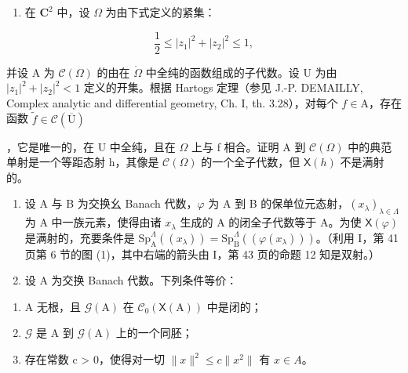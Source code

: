 \begin{enumerate}
\def\labelenumi{\arabic{enumi})}
\setcounter{enumi}{13}
\tightlist
\item
  在 \(\mathbf{C}^2\) 中，设 \(\Omega\) 为由下式定义的紧集：
\end{enumerate}

\[
\frac {1}{2} \leqslant | z _ {1} | ^ {2} + | z _ {2} | ^ {2} \leqslant 1,
\]

并设 A 为 \(\mathcal{C}(\Omega)\) 的由在 \(\mathring{\Omega}\) 中全纯的函数组成的子代数。设 U 为由 \(|z_1|^2 + |z_2|^2 < 1\) 定义的开集。根据 Hartogs 定理（参见 J.-P. DEMAILLY, Complex analytic and differential geometry, Ch. I, th. 3.28），对每个 \(f \in \mathrm{A}\)，存在函数 \(\widetilde{f} \in \mathcal{C}(\overline{\mathrm{U}})\)

，它是唯一的，在 U 中全纯，且在 \(\Omega\) 上与 f 相合。证明 A 到 \(\mathcal{C}(\Omega)\) 中的典范单射是一个等距态射 h，其像是 \(\mathcal{C}(\Omega)\) 的一个全子代数，但 \(\mathsf{X}(h)\) 不是满射的。

\begin{enumerate}
\def\labelenumi{\arabic{enumi})}
\setcounter{enumi}{14}
\item
  设 A 与 B 为交换幺 Banach 代数，\(\varphi\) 为 A 到 B 的保单位元态射，\((x_{\lambda})_{\lambda \in \Lambda}\) 为 A 中一族元素，使得由诸 \(x_{\lambda}\) 生成的 A 的闭全子代数等于 A。为使 \(\mathsf{X}(\varphi)\) 是满射的，充要条件是 \(\mathrm{Sp}_{\mathrm{A}}^{\Lambda}((x_{\lambda})) = \mathrm{Sp}_{\mathrm{B}}^{\Lambda}((\varphi (x_{\lambda})))\)。（利用 I，第 41 页第 6 节的图 (1)，其中右端的箭头由 I，第 43 页的命题 12 知是双射。）
\item
  设 A 为交换 Banach 代数。下列条件等价：
\end{enumerate}

\begin{enumerate}
\def\labelenumi{(\roman{enumi})}
\item
  A 无根，且 \(\mathcal{G}(\mathrm{A})\) 在 \(\mathcal{C}_0(\mathsf{X}(\mathrm{A}))\) 中是闭的；
\item
  \(\mathcal{G}\) 是 A 到 \(\mathcal{G}(\mathrm{A})\) 上的一个同胚；
\item
  存在常数 c \textgreater{} 0，使得对一切 \(\|x\|^{2} \leqslant c\|x^{2}\|\) 有 \(x \in A\)。
\end{enumerate}


